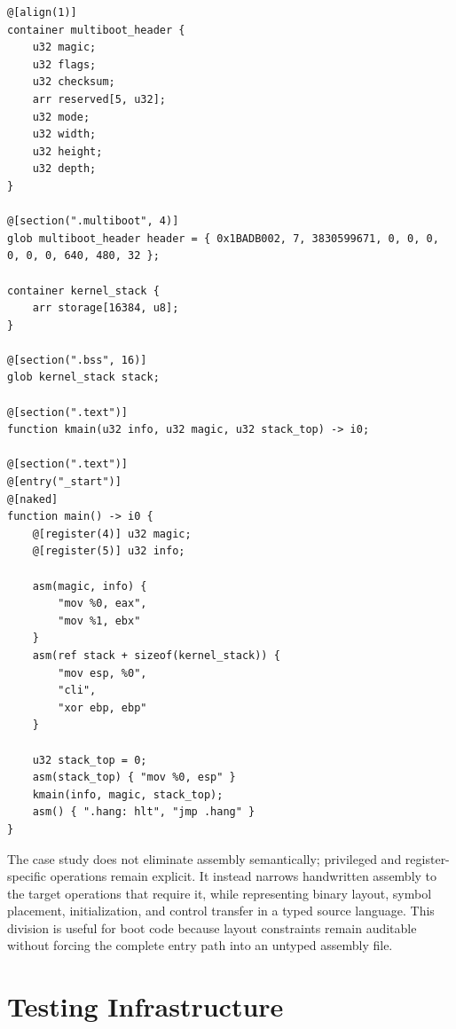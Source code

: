 \documentclass[10pt,twocolumn]{article}
\begin{document}
\begin{lstlisting}[language=CPL,caption={Abridged Multiboot-compatible i386 entry unit.},label={lst:multiboot-cpl},basicstyle=\ttfamily\tiny]
@[align(1)]
container multiboot_header {
    u32 magic;
    u32 flags;
    u32 checksum;
    arr reserved[5, u32];
    u32 mode;
    u32 width;
    u32 height;
    u32 depth;
}

@[section(".multiboot", 4)]
glob multiboot_header header = { 0x1BADB002, 7, 3830599671, 0, 0, 0, 0, 0, 0, 640, 480, 32 };

container kernel_stack {
    arr storage[16384, u8];
}

@[section(".bss", 16)]
glob kernel_stack stack;

@[section(".text")]
function kmain(u32 info, u32 magic, u32 stack_top) -> i0;

@[section(".text")]
@[entry("_start")]
@[naked]
function main() -> i0 {
    @[register(4)] u32 magic;
    @[register(5)] u32 info;

    asm(magic, info) {
        "mov %0, eax",
        "mov %1, ebx"
    }
    asm(ref stack + sizeof(kernel_stack)) {
        "mov esp, %0",
        "cli",
        "xor ebp, ebp"
    }

    u32 stack_top = 0;
    asm(stack_top) { "mov %0, esp" }
    kmain(info, magic, stack_top);
    asm() { ".hang: hlt", "jmp .hang" }
}
\end{lstlisting}

\par The case study does not eliminate assembly semantically; privileged and register-specific operations remain explicit. It instead narrows handwritten assembly to the target operations that require it, while representing binary layout, symbol placement, initialization, and control transfer in a typed source language. This division is useful for boot code because layout constraints remain auditable without forcing the complete entry path into an untyped assembly file.

\section{Testing Infrastructure}
\end{document}
